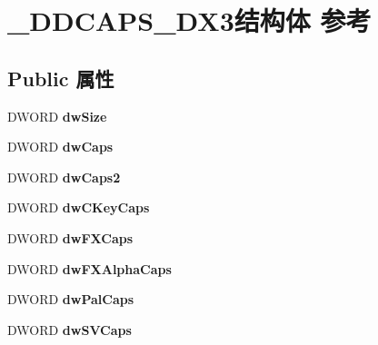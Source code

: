 \hypertarget{struct___d_d_c_a_p_s___d_x3}{}\section{\+\_\+\+D\+D\+C\+A\+P\+S\+\_\+\+D\+X3结构体 参考}
\label{struct___d_d_c_a_p_s___d_x3}
\subsection*{Public 属性}
\begin{DoxyCompactItemize}
\item 
\mbox{\label{struct___d_d_c_a_p_s___d_x3_a9e426b290539c4a5f6cc8026ef43db5a}} 
D\+W\+O\+RD {\bfseries dw\+Size}
\item 
\mbox{\label{struct___d_d_c_a_p_s___d_x3_a61c7fb5e0d39926597aed6ad61d52a69}} 
D\+W\+O\+RD {\bfseries dw\+Caps}
\item 
\mbox{\label{struct___d_d_c_a_p_s___d_x3_ad5989031388e34f5ec6289e0a29c6aa0}} 
D\+W\+O\+RD {\bfseries dw\+Caps2}
\item 
\mbox{\label{struct___d_d_c_a_p_s___d_x3_ab67ab27aa9eaab6cbc85d1afe9d8de83}} 
D\+W\+O\+RD {\bfseries dw\+C\+Key\+Caps}
\item 
\mbox{\label{struct___d_d_c_a_p_s___d_x3_acbf01e68f28a171405afc4fba8d2515a}} 
D\+W\+O\+RD {\bfseries dw\+F\+X\+Caps}
\item 
\mbox{\label{struct___d_d_c_a_p_s___d_x3_a61b1a065beb55b8d7ed4d22f9e158618}} 
D\+W\+O\+RD {\bfseries dw\+F\+X\+Alpha\+Caps}
\item 
\mbox{\label{struct___d_d_c_a_p_s___d_x3_a7296d58de09d18137402f871ba44282b}} 
D\+W\+O\+RD {\bfseries dw\+Pal\+Caps}
\item 
\mbox{\label{struct___d_d_c_a_p_s___d_x3_ad8d3de30983a0857d240265e92c85520}} 
D\+W\+O\+RD {\bfseries dw\+S\+V\+Caps}
\item 
\mbox{\label{struct___d_d_c_a_p_s___d_x3_ad44bda1d0358b81aad9bbce95e84c10b}} 

\end{DoxyCompactItemize}
